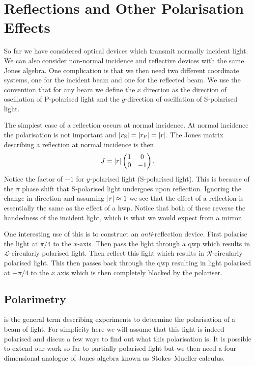     \section{Reflections and Other Polarisation Effects}
    So far we have considered optical devices which transmit normally incident light.
    We can also consider non-normal incidence and reflective devices with the same Jones algebra.
    One complication is that we then need two different coordinate systems, one for the incident beam and one for the reflected beam.
    We use the convention that for any beam we define the \(x\) direction as the direction of oscillation of P-polarised light and the \(y\)-direction of oscillation of S-polarised light.
    
    The simplest case of a reflection occurs at normal incidence.
    At normal incidence the polarisation is not important and \(\abs{{r}_{\mathrm{{S}}}} = \abs{{r}_{\mathrm{{P}}}} = \abs{r}\).
    The Jones matrix describing a reflection at normal incidence is then
    \[
        J = \abs{r}
        \begin{pmatrix}
            1 & 0\\
            0 & -1
        \end{pmatrix}
        .
    \]
    Notice the factor of \(-1\) for \(y\)-polarised light (S-polarised light).
    This is because of the \(\pi\) phase shift that S-polarised light undergoes upon reflection.
    Ignoring the change in direction and assuming \(\abs{r}\approx 1\) we see that the effect of a reflection is essentially the same as the effect of a \gls{hwp}.
    Notice that both of these reverse the handedness of the incident light, which is what we would expect from a mirror.
    
    One interesting use of this is to construct an \emph{anti}-reflection device.
    First polarise the light at \(\pi/4\) to the \(x\)-axis.
    Then pass the light through a \gls{qwp} which results in \(\mathcal{L}\)-circularly polarised light.
    Then reflect this light which results in \(\mathcal{R}\)-circularly polarised light.
    This then passes back through the \gls{qwp} resulting in light polarised at \(-\pi/4\) to the \(x\) axis which is then completely blocked by the polariser.
    
    \subsection{Polarimetry}
     is the general term describing experiments to determine the polarisation of a beam of light.
    For simplicity here we will assume that this light is indeed polarised and discus a few ways to find out what this polarisation is.
    It is possible to extend our work so far to partially polarised light but we then need a four dimensional analogue of Jones algebra known as Stokes--Mueller calculus.
    
